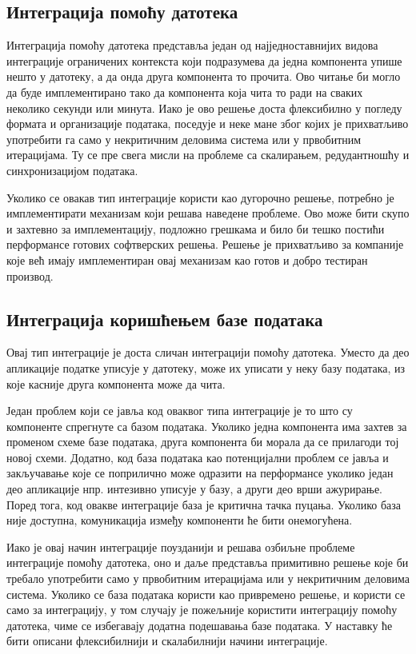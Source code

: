 \documentclass[12pt,oneside]{memoir}
\begin{document}
\subsection{Интеграција помоћу датотека}
Интеграција помоћу датотека представља један од најједноставнијих видова интеграције ограничених контекста који подразумева да једна компонента упише нешто у датотеку, а да онда друга компонента то прочита. Ово читање би могло да буде имплементирано тако да компонента која чита то ради на сваких неколико секунди или минута. Иако је ово решење доста флексибилно у погледу формата и организације података, поседује и неке мане због којих је прихватљиво употребити га само у некритичним деловима система или у првобитним итерацијама. Ту се пре свега мисли на проблеме са скалирањем, редудантношћу и синхронизацијом података.

Уколико се овакав тип интеграције користи као дугорочно решење, потребно је имплементирати механизам који решава наведене проблеме. Ово може бити скупо и захтевно за имплементацију, подложно грешкама и било би тешко постићи перформансе готових софтверских решења. Решење је прихватљиво за компаније које већ имају имплементиран овај механизам као готов и добро тестиран производ.

\subsection{Интеграција коришћењем базе података}
Овај тип интеграције је доста сличан интеграцији помоћу датотека. Уместо да део апликације податке уписује у датотеку, може их уписати у неку базу података, из које касније друга компонента може да чита. 

Један проблем који се јавља код оваквог типа интеграције је то што су компоненте спрегнуте са базом података. Уколико једна компонента има захтев за променом схеме базе података, друга компонента би морала да се прилагоди тој новој схеми. Додатно, код база података као потенцијални проблем се јавља и закључавање које се поприлично може одразити на перформансе уколико један део апликације нпр. интезивно уписује у базу, а други део врши ажурирање. Поред тога, код овакве интеграције база је критична тачка пуцања. Уколико база није доступна, комуникација између компоненти ће бити онемогућена.

Иако је овај начин интеграције поузданији и решава озбиљне проблеме интеграције помоћу датотека, оно и даље представља примитивно решење које би требало употребити само у првобитним итерацијама или у некритичним деловима система. Уколико се база података користи као привремено решење, и користи се само за интеграцију, у том случају је пожељније користити интеграцију помоћу датотека, чиме се избегавају додатна подешавања базе података. У наставку ће бити описани флексибилнији и скалабилнији начини интеграције.
\end{document}
